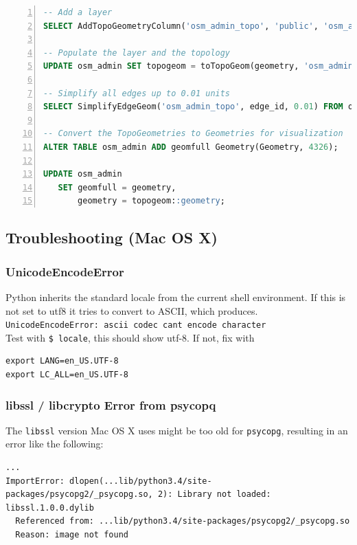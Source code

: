 \documentclass[paper=a4, fontsize=11pt]{article} %
\numberwithin{equation}{section} %
\numberwithin{figure}{section} %
\numberwithin{table}{section} %
\begin{document}
{\begin{lstlisting}[language=sql,numbers=left]
-- Add a layer
SELECT AddTopoGeometryColumn('osm_admin_topo', 'public', 'osm_admin', 'topogeom', 'MULTIPOLYGON');

-- Populate the layer and the topology
UPDATE osm_admin SET topogeom = toTopoGeom(geometry, 'osm_admin_topo', 1);

-- Simplify all edges up to 0.01 units
SELECT SimplifyEdgeGeom('osm_admin_topo', edge_id, 0.01) FROM osm_admin_topo.edge;

-- Convert the TopoGeometries to Geometries for visualization
ALTER TABLE osm_admin ADD geomfull Geometry(Geometry, 4326);

UPDATE osm_admin
   SET geomfull = geometry,
       geometry = topogeom::geometry;
\end{lstlisting}

\clearpage
\subsection{Troubleshooting (Mac OS X)}\label{troubleshooting}

\subsubsection*{UnicodeEncodeError}\label{unicodeencodeerror}

Python inherits the standard locale from the current shell environment.
If this is not set to utf8 it tries to convert to ASCII, which
produces.\\
\texttt{UnicodeEncodeError:\ \textquotesingle{}ascii\textquotesingle{}\ codec\ can\textquotesingle{}t\ encode\ character}\\Test
with \texttt{\$\ locale}, this should show utf-8. If not, fix with
\begin{verbatim}
export LANG=en_US.UTF-8
export LC_ALL=en_US.UTF-8
\end{verbatim}

\subsubsection*{libssl / libcrypto Error from
psycopq}\label{libssl-libcrypto-error-from-psycopq}

The \texttt{libssl} version Mac OS X uses might be too old for
\texttt{psycopg}, resulting in an error like the following:

\begin{lstlisting}[breaklines=true]
...
ImportError: dlopen(...lib/python3.4/site-packages/psycopg2/_psycopg.so, 2): Library not loaded: libssl.1.0.0.dylib
  Referenced from: ...lib/python3.4/site-packages/psycopg2/_psycopg.so
  Reason: image not found
\end{lstlisting}

}
\end{document}
